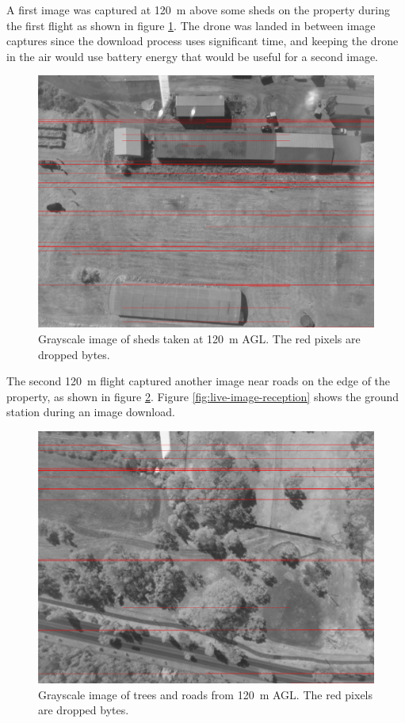 \documentclass[]{report}
\begin{document}
A first image was captured at \SI{120}{\metre} above some sheds on the property during the first flight as shown in figure \ref{fig:sheds-received}. The drone was landed in between image captures since the download process uses significant time, and keeping the drone in the air would use battery energy that would be useful for a second image.

\begin{figure}[H]
  \centering
  \includegraphics[width=\linewidth]{images/sheds_received.png}
  \caption{Grayscale image of sheds taken at \SI{120}{\metre} AGL. The red pixels are dropped bytes.}
  \label{fig:sheds-received}
\end{figure}

The second \SI{120}{\metre} flight captured another image near roads on the edge of the property, as shown in figure \ref{fig:road-received}. Figure \ref{fig:live-image-reception} shows the ground station during an image download.

\begin{figure}[H]
  \centering
  \includegraphics[width=\linewidth]{images/road_received.png}
  \caption{Grayscale image of trees and roads from \SI{120}{\metre} AGL. The red pixels are dropped bytes.}
  \label{fig:road-received}
\end{figure}
\end{document}
